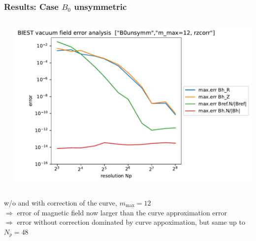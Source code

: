 \documentclass[aspectratio=169]{beamer}
\newcommand{\textc}[1]{\textcolor{iagcolor}{#1}}
\begin{document}
\begin{frame}
 \frametitle{Results: Case $B_0$ unsymmetric}
 \centering\small
 \begin{columns}[t]
  \begin{column}{0.38\textwidth}
  \end{column}
 \begin{column}{0.6\textwidth}
   {\includegraphics[height=0.7\textheight]{pics/BIEST_vf_err_B0unsymm_m_max=12_rzcorr.pdf}}
  \end{column}
 \end{columns}
 w/o and with correction of the curve, {$m_\text{max}=12$}\\
  \textc{$\Rightarrow$ error of magnetic field now larger than the curve approximation error}\\
 {\textc{$\Rightarrow$ error without correction dominated by curve appoximation, but same up to $N_p=48$}}

\end{frame}
\end{document}
